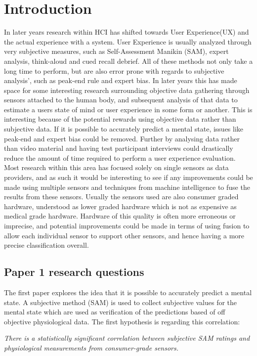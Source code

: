 \chapter{Introduction}
In later years research within HCI has shifted towards User Experience(UX) and the actual experience with a system.
User Experience is usually analyzed through very subjective measures, such as Self-Assessment Manikin (SAM), expert analysis, think-aloud and cued recall debrief. 
All of these methods not only take a long time to perform, but are also error prone with regards to subjective analysis', such as peak-end rule and expert bias.
In later years this has made space for some interesting research surrounding objective data gathering through sensors attached to the human body, and subsequent analysis of that data to estimate a users state of mind or user experience in some form or another. 
This is interesting because of the potential rewards using objective data rather than subjective data. 
If it is possible to accurately predict a mental state, issues like peak-end and expert bias could be removed. 
Further by analysing data rather than video material and having test participant interviews could drastically reduce the amount of time required to perform a user experience evaluation. 
Most research within this area has focused solely on single sensors as data providers, and as such it would be interesting to see if any improvements could be made using multiple sensors and techniques from machine intelligence to fuse the results from these sensors. 
Usually the sensors used are also consumer graded hardware, understood as lower graded hardware which is not as expensive as medical grade hardware. 
Hardware of this quality is often more erroneous or imprecise, and potential improvements could be made in terms of using fusion to allow each individual sensor to support other sensors, and hence having a more precise classification overall.

\section{Paper 1 research questions}
The first paper explores the idea that it is possible to accurately predict a mental state. A subjective method (SAM) is used to collect subjective values for the mental state which are used as verification of the predictions based of off objective physiological data. The first hypothesis is regarding this correlation:

\textit{There is a statistically significant correlation between subjective SAM ratings and physiological measurements from consumer-grade sensors.}\\\\

